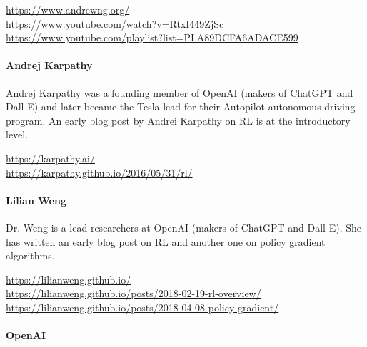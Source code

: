 \begin{tcolorbox}[colback=code]
\footnotesize
\url{https://www.andrewng.org/} \\

\url{https://www.youtube.com/watch?v=RtxI449ZjSc} \\

\url{https://www.youtube.com/playlist?list=PLA89DCFA6ADACE599}
\end{tcolorbox}


\paragraph*{Andrej Karpathy}

Andrej Karpathy was a founding member of OpenAI (makers of ChatGPT and Dall-E) and later became the Tesla lead for their Autopilot autonomous driving program. An early blog post by Andrei Karpathy on RL is at the introductory level. \\

\begin{tcolorbox}[colback=code]
\footnotesize
\url{https://karpathy.ai/} \\

\url{https://karpathy.github.io/2016/05/31/rl/}
\end{tcolorbox}


\paragraph*{Lilian Weng}

Dr. Weng is a lead researchers at OpenAI (makers of ChatGPT and Dall-E). She has written an early blog post on RL and another one on policy gradient algorithms. \\

\begin{tcolorbox}[colback=code]
\footnotesize
\url{https://lilianweng.github.io/} \\

\url{https://lilianweng.github.io/posts/2018-02-19-rl-overview/}\\

\url{https://lilianweng.github.io/posts/2018-04-08-policy-gradient/}
\end{tcolorbox}


\paragraph*{OpenAI}

